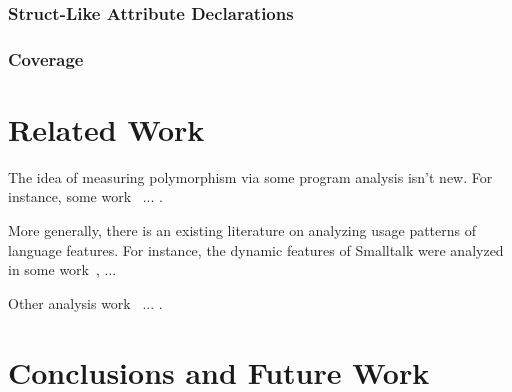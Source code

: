 \documentclass[acmsmall,10pt,review,anonymous]{acmart}\settopmatter{printfolios=true,printccs=false,printacmref=false}
\begin{document}
%
%
\subsubsection{Struct-Like Attribute Declarations}


%
\subsubsection{Coverage}


%
%
%
%
\section{Related Work}


The idea of measuring polymorphism via some program analysis isn't new.
For instance, some work~\cite{aakerblom2015measuring} ... .

More generally, there is an existing literature on analyzing usage patterns of language features.
For instance, the dynamic features of Smalltalk were analyzed in some work~\cite{callau2011howdevelopers}, ...

Other analysis work~\cite{milojkovic2017duck} ... .

\section{Conclusions and Future Work}



\end{document}
